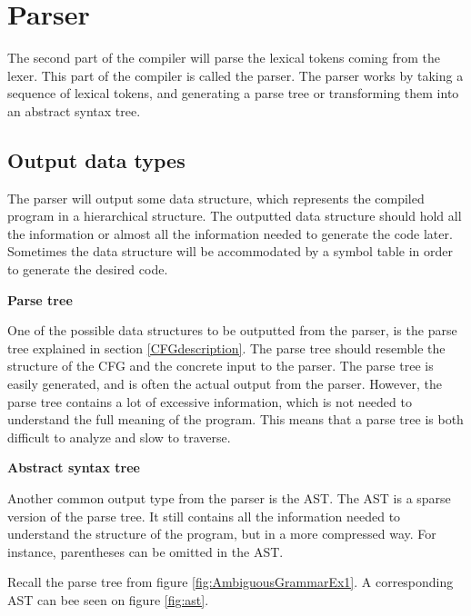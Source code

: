 \section{Parser}

The second part of the compiler will parse the lexical tokens coming from the lexer. 
This part of the compiler is called the parser. 
The parser works by taking a sequence of lexical tokens, and generating a parse tree or transforming them into an abstract syntax tree. 

\subsection{Output data types}

The parser will output some data structure, which represents the compiled program in a hierarchical structure. 
The outputted data structure should hold all the information or almost all the information needed to generate the code later. 
Sometimes the data structure will be accommodated by a symbol table in order to generate the desired code.

\textbf{Parse tree}

One of the possible data structures to be outputted from the parser, is the parse tree explained in section \ref{CFGdescription}. 
The parse tree should resemble the structure of the CFG and the concrete input to the parser. 
The parse tree is easily generated, and is often the actual output from the parser. 
However, the parse tree contains a lot of excessive information, which is not needed to understand the full meaning of the program. 
This means that a parse tree is both difficult to analyze and slow to traverse. 

\textbf{Abstract syntax tree}

Another common output type from the parser is the AST.
The AST is a sparse version of the parse tree. 
It still contains all the information needed to understand the structure of the program, but in a more compressed way. 
For instance, parentheses can be omitted in the AST.

Recall the parse tree from figure \ref{fig:AmbiguousGrammarEx1}. 
A corresponding AST can bee seen on figure \ref{fig:ast}.

